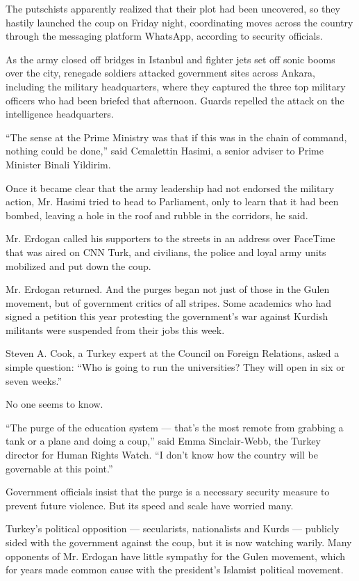 The putschists apparently realized that their plot had been uncovered,
so they hastily launched the coup on Friday night, coordinating moves
across the country through the messaging platform WhatsApp, according to
security officials.

As the army closed off bridges in Istanbul and fighter jets set off
sonic booms over the city, renegade soldiers attacked government sites
across Ankara, including the military headquarters, where they captured
the three top military officers who had been briefed that afternoon.
Guards repelled the attack on the intelligence headquarters.

``The sense at the Prime Ministry was that if this was in the chain of
command, nothing could be done,'' said Cemalettin Hasimi, a senior
adviser to Prime Minister Binali Yildirim.

Once it became clear that the army leadership had not endorsed the
military action, Mr. Hasimi tried to head to Parliament, only to learn
that it had been bombed, leaving a hole in the roof and rubble in the
corridors, he said.

Mr. Erdogan called his supporters to the streets in an address over
FaceTime that was aired on CNN Turk, and civilians, the police and loyal
army units mobilized and put down the coup.

Mr. Erdogan returned. And the purges began not just of those in the
Gulen movement, but of government critics of all stripes. Some academics
who had signed a petition this year protesting the government's war
against Kurdish militants were suspended from their jobs this week.

Steven A. Cook, a Turkey expert at the Council on Foreign Relations,
asked a simple question: ``Who is going to run the universities? They
will open in six or seven weeks.''

No one seems to know.

``The purge of the education system --- that's the most remote from
grabbing a tank or a plane and doing a coup,'' said Emma Sinclair-Webb,
the Turkey director for Human Rights Watch. ``I don't know how the
country will be governable at this point.''

Government officials insist that the purge is a necessary security
measure to prevent future violence. But its speed and scale have worried
many.

Turkey's political opposition --- secularists, nationalists and Kurds
--- publicly sided with the government against the coup, but it is now
watching warily. Many opponents of Mr. Erdogan have little sympathy for
the Gulen movement, which for years made common cause with the
president's Islamist political movement.

